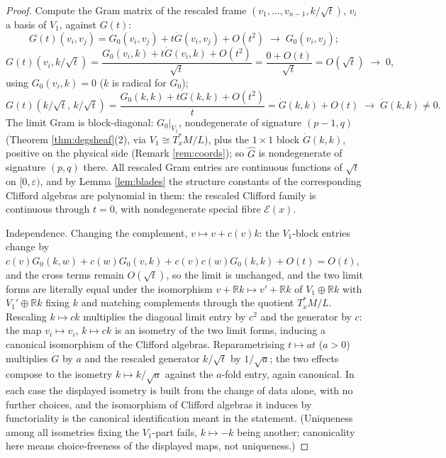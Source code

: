 \documentclass[11pt]{article}
\theoremstyle{definition}
\newcommand{\R}{\mathbb{R}}
\newcommand{\shE}{\mathcal{E}}
\newcommand{\shL}{L}
\begin{document}
\begin{proof}
Compute the Gram matrix of the rescaled frame $(v_1, \dots, v_{n-1}, k/\sqrt{t})$, $v_i$ a basis of $V_1$, against $G(t)$:
\[
G(t)(v_i, v_j) = G_0(v_i,v_j) + t\dot G(v_i,v_j) + O(t^2) \;\longrightarrow\; G_0(v_i,v_j) ;
\]
\[
G(t)(v_i, k/\sqrt{t}) = \frac{G_0(v_i,k) + t\dot G(v_i,k) + O(t^2)}{\sqrt{t}} = \frac{0 + O(t)}{\sqrt{t}} = O(\sqrt{t}) \;\longrightarrow\; 0 ,
\]
using $G_0(v_i, k) = 0$ ($k$ is radical for $G_0$);
\[
G(t)(k/\sqrt{t},\, k/\sqrt{t}) = \frac{G_0(k,k) + t\dot G(k,k) + O(t^2)}{t} = \dot G(k,k) + O(t) \;\longrightarrow\; \dot G(k,k) \neq 0 .
\]
The limit Gram is block-diagonal: $G_0|_{V_1}$, nondegenerate of signature $(p{-}1,q)$ (Theorem \ref{thm:degsheaf}(2), via $V_1 \cong T^*_xM/\shL$), plus the $1 \times 1$ block $\dot G(k,k)$, positive on the physical side (Remark \ref{rem:coords}); so $\hat G$ is nondegenerate of signature $(p,q)$ there. All rescaled Gram entries are continuous functions of $\sqrt{t}$ on $[0, \varepsilon)$, and by Lemma \ref{lem:blades} the structure constants of the corresponding Clifford algebras are polynomial in them: the rescaled Clifford family is continuous through $t = 0$, with nondegenerate special fibre $\shE(x)$.

Independence. Changing the complement, $v \mapsto v + c(v)k$: the $V_1$-block entries change by $c(v)G_0(k, w) + c(w)G_0(v,k) + c(v)c(w)G_0(k,k) + O(t) = O(t)$, and the cross terms remain $O(\sqrt t)$, so the limit is unchanged, and the two limit forms are literally equal under the isomorphism $v + \R k \mapsto v' + \R k$ of $V_1 \oplus \R k$ with $V_1' \oplus \R k$ fixing $k$ and matching complements through the quotient $T^*_xM/\shL$. Rescaling $k \mapsto ck$ multiplies the diagonal limit entry by $c^2$ and the generator by $c$: the map $v_i \mapsto v_i$, $k \mapsto ck$ is an isometry of the two limit forms, inducing a canonical isomorphism of the Clifford algebras. Reparametrising $t \mapsto at$ ($a > 0$) multiplies $\dot G$ by $a$ and the rescaled generator $k/\sqrt{t}$ by $1/\sqrt{a}$; the two effects compose to the isometry $k \mapsto k/\sqrt a$ against the $a$-fold entry, again canonical. In each case the displayed isometry is built from the change of data alone, with no further choices, and the isomorphism of Clifford algebras it induces by functoriality is the canonical identification meant in the statement. (Uniqueness among all isometries fixing the $V_1$-part fails, $k \mapsto -k$ being another; canonicality here means choice-freeness of the displayed maps, not uniqueness.)
\end{proof}
\end{document}
